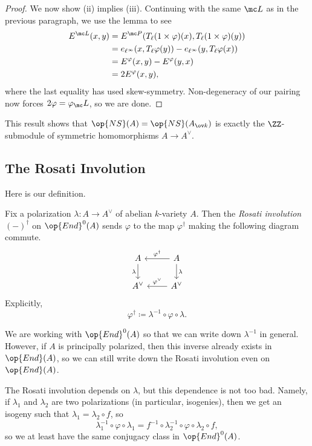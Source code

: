 \documentclass[../notes.tex]{subfiles}
\begin{document}
\begin{proof}
	We now show (ii) implies (iii). Continuing with the same $\mc L$ as in the previous paragraph, we use the lemma to see
	\begin{align*}
		E^{\mc L}(x,y) &= E^{\mc P}(T_\ell(1\times\varphi)(x),T_\ell(1\times\varphi)(y)) \\
		&= e_{\ell^\infty}(x,T_\ell\varphi(y))-e_{\ell^\infty}(y,T_\ell\varphi(x)) \\
		&= E^\varphi(x,y)-E^\varphi(y,x) \\
		&= 2E^\varphi(x,y),
	\end{align*}
	where the last equality has used skew-symmetry. Non-degeneracy of our pairing now forces $2\varphi=\varphi_\mc L$, so we are done.
\end{proof}
\begin{remark}
	This result shows that $\op{NS}(A)=\op{NS}(A_{\ov k})$ is exactly the $\ZZ$-submodule of symmetric homomorphisms $A\to A^\lor$.
\end{remark}

\subsection{The Rosati Involution}
Here is our definition.
\begin{definition}
	Fix a polarization $\lambda\colon A\to A^\lor$ of abelian $k$-variety $A$. Then the \textit{Rosati involution} $(-)^\dagger$ on $\op{End}^0(A)$ sends $\varphi$ to the map $\varphi^\dagger$ making the following diagram commute.
	\[\begin{tikzcd}
		A & A \\
		{A^\lor} & {A^\lor}
		\arrow["{\varphi^\lor}"', from=2-2, to=2-1]
		\arrow["{\varphi^\dagger}"', from=1-2, to=1-1]
		\arrow["\lambda", from=1-2, to=2-2]
		\arrow["\lambda"', from=1-1, to=2-1]
	\end{tikzcd}\]
	Explicitly,
	\[\varphi^\dagger\coloneqq\lambda^{-1}\circ\varphi\circ\lambda.\]
\end{definition}
\begin{remark}
	We are working with $\op{End}^0(A)$ so that we can write down $\lambda^{-1}$ in general. However, if $A$ is principally polarized, then this inverse already exists in $\op{End}(A)$, so we can still write down the Rosati involution even on $\op{End}(A)$.
\end{remark}
\begin{remark}
	The Rosati involution depends on $\lambda$, but this dependence is not too bad. Namely, if $\lambda_1$ and $\lambda_2$ are two polarizations (in particular, isogenies), then we get an isogeny such that $\lambda_1=\lambda_2\circ f$, so
	\[\lambda_1^{-1}\circ\varphi\circ\lambda_1=f^{-1}\circ\lambda_2^{-1}\circ\varphi\circ\lambda_2\circ f,\]
	so we at least have the same conjugacy class in $\op{End}^0(A)$.
\end{remark}
\end{document}
